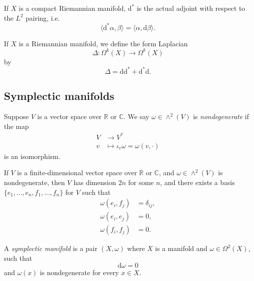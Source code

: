 \documentclass[12pt,letterpaper,reqno]{article}
\numberwithin{equation}{section}
\newcommand{\R}{\ensuremath{\mathbb R}}
\newcommand{\C}{\ensuremath{\mathbb C}}
\newcommand{\de}{\mathrm{d}}
\newcommand{\IP}[1]{\langle#1\rangle}
\newcommand{\ti}[1]{\textit{#1}}
\newcommand{\fixme}[1]{{\color{orange}{[#1]}}}
\begin{document}
\begin{lem}
If $X$ is a compact Riemannian manifold, $\de^*$ is the actual adjoint
with respect to the $L^2$ pairing, i.e.
\begin{equation}
  \IP{\de^* \alpha,\beta} = \IP{\alpha,\de \beta}.
\end{equation}
\end{lem}

\begin{defn}
If $X$ is a Riemannian manifold, we define the form Laplacian
\begin{equation}
  \Delta: \Omega^k(X) \to \Omega^k(X)
\end{equation}
by
\begin{equation} \label{eq:form-laplacian}
  \Delta = \de \de^* + \de^* \de.
\end{equation}
\end{defn}
\fixme{...}


\subsection{Symplectic manifolds}

\begin{defn} \label{def:nondegenerate-skew-pairing}
Suppose $V$ is a vector space over $\R$ or $\C$.
We say $\omega \in \wedge^2(V)$ is \ti{nondegenerate}
if the map
\begin{align}
  V &\to V^* \\
  v &\mapsto \iota_v \omega = \omega(v,\cdot)
\end{align}
is an isomorphism.
\end{defn}

\begin{prop}
\label{prop:standard-nondegenerate-skew-pairing}
If $V$ is a finite-dimensional vector space over $\R$ or $\C$, and
$\omega \in \wedge^2(V)$ is nondegenerate, then $V$ has
dimension $2n$ for some $n$, and there
exists a basis $\{e_1, \dots, e_n, f_1, \dots, f_n\}$ for $V$
such that
\begin{align}
\omega(e_i, f_j) &= \delta_{ij}, \\
\omega(e_i, e_j) &= 0, \\
\omega(f_i, f_j) &= 0.
\end{align}
\end{prop}

\begin{defn} \label{def:symplectic-manifold}
A \ti{symplectic manifold} is a pair $(X,\omega)$
where $X$ is a manifold and
$\omega \in \Omega^2(X)$, such that
\begin{equation}
  \de \omega = 0
\end{equation}
and $\omega(x)$ is nondegenerate for every $x \in X$.
\end{defn}
\end{document}
